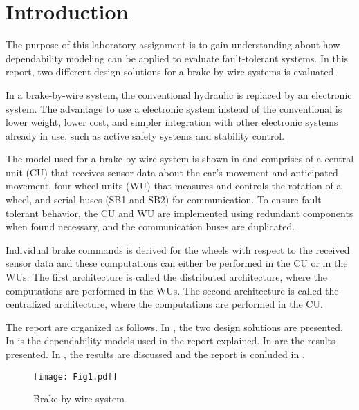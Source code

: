 \newpage
\section{Introduction}
\label{S1}
The purpose of this laboratory assignment is to gain understanding about how dependability modeling can be applied to evaluate fault-tolerant systems. In this report, two different design solutions for a brake-by-wire systems is evaluated.
 
In a brake-by-wire system, the conventional hydraulic is replaced by an electronic system. The advantage to use a electronic system instead of the conventional is lower weight, lower cost, and simpler integration with other electronic systems already in use, such as active safety systems and stability control. 


The model used for a brake-by-wire system is shown in  and comprises of a central unit (CU) that receives sensor data about the car's movement and anticipated movement, four wheel units (WU) that measures and controls the rotation of a wheel, and serial buses (SB1 and SB2) for communication. To ensure fault tolerant behavior, the CU and WU are implemented using redundant components when found necessary, and the communication buses are duplicated. 

Individual brake commands is derived for the wheels with respect to the received sensor data and these computations can either be performed in the CU or in the WUs. The first architecture is called the distributed architecture, where the computations are performed in the WUs. The second architecture is called the centralized architecture, where the computations are performed in the CU.

The report are organized as follows. In , the two design solutions are presented. In  is the dependability models used in the report explained. In  are the results presented. In , the results are discussed and the report is conluded in .

\begin{figure}[h!]
  \centering
  \texttt{[image: Fig1.pdf]}
  \caption{Brake-by-wire system}
  \label{bbwsys}
\end{figure}